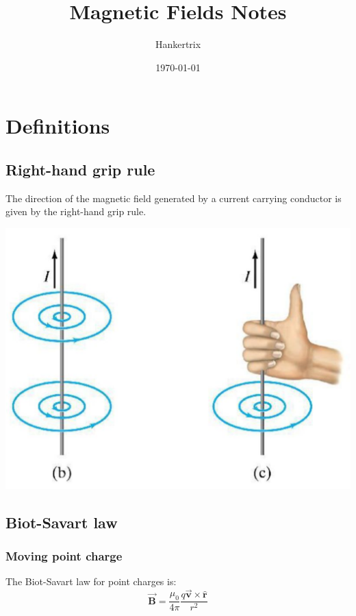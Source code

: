 \documentclass[11pt]{article}
\author{Hankertrix}
\date{\today}
\title{Magnetic Fields Notes}
\begin{document}
\maketitle
\setcounter{tocdepth}{2}
\tableofcontents \clearpage\section{Definitions}
\label{sec:org50827df}

\subsection{Right-hand grip rule}
\label{sec:orgcd9c35d}
The direction of the magnetic field generated by a current carrying conductor is given by the right-hand grip rule.

\begin{center}
\includegraphics[scale=0.15]{./images/right-hand-grip-rule.png}
\end{center}
\subsection{Biot-Savart law}
\label{sec:org02aec89}

\subsubsection{Moving point charge}
\label{sec:orgb57838c}
The Biot-Savart law for point charges is:
\[\vec{\boldsymbol{B}} = \frac{\mu_0}{4 \pi} \frac{q \vec{\boldsymbol{v}} \times \hat{\boldsymbol{r}}}{r^2}\]
\end{document}
